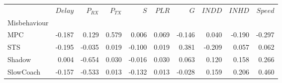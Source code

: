 \begin{tabular}{lrrrrrrrrr}
\toprule
{} &  $Delay$ &  $P_{RX}$ &  $P_{TX}$ &    $S$ &  $PLR$ &    $G$ &  $INDD$ &  $INHD$ &  $Speed$ \\
Misbehaviour &          &           &           &        &        &        &         &         &          \\
\midrule
MPC          &   -0.187 &     0.129 &     0.579 &  0.006 &  0.069 & -0.146 &   0.040 &  -0.190 &   -0.297 \\
STS          &   -0.195 &    -0.035 &     0.019 & -0.100 &  0.019 &  0.381 &  -0.209 &   0.057 &    0.062 \\
Shadow       &    0.004 &    -0.654 &     0.030 & -0.016 &  0.030 &  0.063 &   0.120 &   0.158 &    0.266 \\
SlowCoach    &   -0.157 &    -0.533 &     0.013 & -0.132 &  0.013 & -0.028 &   0.159 &   0.206 &    0.460 \\
\bottomrule
\end{tabular}
